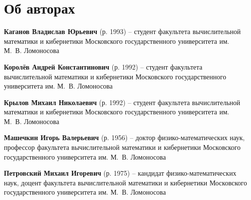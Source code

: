 \section*{Об авторах}
{\bf Каганов Владислав Юрьевич}  (р. 1993) -- студент факультета вычислительной 
математики и кибернетики Московского государственного университета им. М.~В. 
Ломоносова

{\bf Королёв Андрей Константинович}  (р. 1992) -- студент факультета 
вычислительной математики и кибернетики Московского государственного 
университета им. М.~В. Ломоносова

{\bf Крылов Михаил Николаевич}  (р. 1992) -- студент факультета вычислительной 
математики и кибернетики Московского государственного университета им. М.~В. 
Ломоносова

{\bf Машечкин Игорь Валерьевич}  (р. 1956) -- доктор физико-математических 
наук, профессор факультета вычислительной математики и кибернетики Московского 
государственного университета им. М.~В. Ломоносова

{\bf Петровский Михаил Игоревич}  (р. 1975) -- кандидат физико-математических 
наук, доцент факультета вычислительной математики и кибернетики Московского 
государственного университета им. М.~В. Ломоносова

